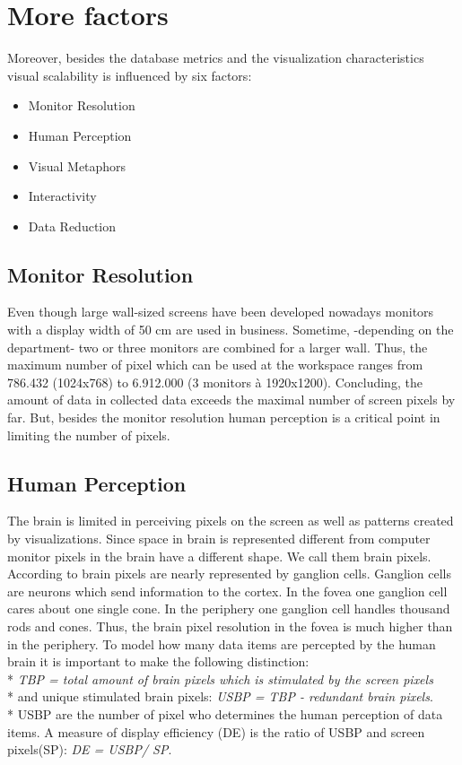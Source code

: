 \section{More factors} \label{factors}
Moreover, besides the database metrics and the visualization characteristics visual scalability is influenced by six factors\cite{Eick2002}: 
\begin{itemize}
    \item Monitor Resolution 
    \item Human Perception\cite{Keim2005,Deering1998}
    \item Visual Metaphors
    \item Interactivity
    \item Data Reduction
\end{itemize}

\subsection{Monitor Resolution}\label{resolution}
Even though large wall-sized screens have been developed nowadays monitors with a display width of 50 cm are used in business. Sometime, -depending on the department- two or three monitors are combined for a larger wall. Thus, the maximum number of pixel which can be used at the workspace ranges from 786.432 (1024x768) to 6.912.000 (3 monitors à 1920x1200).
Concluding, the amount of data in collected data exceeds the maximal number of screen pixels by far. But, besides the monitor resolution human perception is a critical point in limiting the number of pixels.

\subsection{Human Perception} \label{perception}
The brain is limited in perceiving pixels on the screen as well as patterns created by visualizations. Since space in brain is represented different from computer monitor pixels in the brain have a different shape. We call them brain pixels. According to \cite{Ware2012a} brain pixels are nearly represented by ganglion cells. Ganglion cells are neurons which send information to the cortex. In the fovea one ganglion cell cares about one single cone. In the periphery one ganglion cell handles thousand rods and cones. Thus, the brain pixel resolution in the fovea is much higher than in the periphery. 
To model how many data items are percepted by the human brain it is important to make the following distinction: 
\\*
\textit{TBP = total amount of brain pixels which is stimulated by the screen pixels}\\*
and unique stimulated brain pixels: \textit{USBP = TBP - redundant brain pixels}.\\*
USBP are the number of pixel who determines the human perception of data items. A measure of display efficiency (DE) is the ratio of USBP and screen pixels(SP): \textit{DE = USBP/ SP}.

